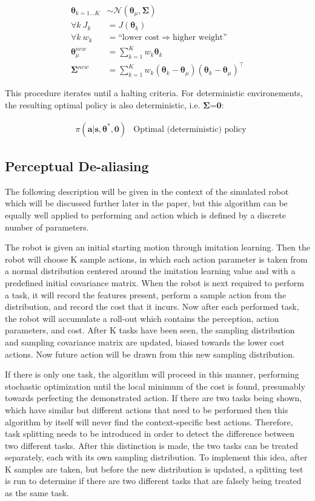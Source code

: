 \documentclass[12pt]{article}
\newcommand{\mymath}[1]{\ensuremath{#1}\xspace}
\newcommand{\act}    {\mymath{\mathbf{a}}}
\newcommand{\sta}    {\mymath{\mathbf{s}}}
\newcommand{\app}    {\mymath{\bm{\theta}}}
\newcommand{\covar}  {\mymath{\bm{\Sigma}}}
\begin{document}
\begin{align}
\app_{k=1\dots K} & {\sim}\mathcal{N}({\app_\mu},{\covar})\label{equ_so_sample}\\
\forall k~J_k & = J(\app_k) \label{equ_so_cost}\\
\forall k~w_k & = \mbox{``lower cost} \Rightarrow \mbox{higher weight''}\label{equ_so_cost_to_w}\\
\app_\mu^{new} & = \sum_{k=1}^{K} w_k \app_k\label{equ_so_wa_mean}\\
\covar^{new} & = \sum_{k=1}^{K}w_k(\app_k-\app_\mu)(\app_k-\app_\mu)^\intercal\label{equ_so_wa_covar}
\end{align}

This procedure iterates until a halting criteria. For deterministic environements, the resulting optimal policy is also deterministic, i.e. \covar=$\mathbf{0}$:

\begin{align}
& \pi(\act|\sta,\app^*,\mathbf{0}) & \mbox{Optimal (deterministic) policy} \label{eq:stoch_opt}
\end{align}

\subsection{Perceptual De-aliasing}
The following description will be given in the context of the simulated robot which will be discussed further later in the paper, but this algorithm can be equally well applied to performing and action which is defined by a discrete number of parameters. 

The robot is given an initial starting motion through imitation learning. Then the robot will choose K sample actions, in which each action parameter is taken from a normal distribution centered around the imitation learning value and with a predefined initial covariance matrix. When the robot is next required to perform a task, it will record the features present, perform a sample action from the distribution, and record the cost that it incurs. Now after each performed task, the robot will accumulate a roll-out which contains the perception, action parameters, and cost. After K tasks have been seen, the sampling distribution and sampling covariance matrix are updated, biased towards the lower cost actions. Now future action will be drawn from this new sampling distribution. 

If there is only one task, the algorithm will proceed in this manner, performing stochastic optimization until the local minimum of the cost is found, presumably towards perfecting the demonstrated action. If there are two tasks being shown, which have similar but different actions that need to be performed then this algorithm by itself will never find the context-specific best actions. Therefore, task splitting needs to be introduced in order to detect the difference between two different tasks. After this distinction is made, the two tasks can be treated separately, each with its own sampling distribution. To implement this idea, after K samples are taken, but before the new distribution is updated, a splitting test is run to determine if there are two different tasks that are falsely being treated as the same task.
\end{document}
